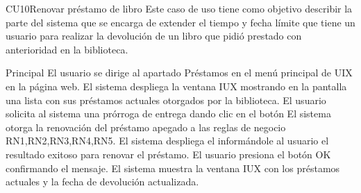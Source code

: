 
	\begin{UseCase}{CU10}{Renovar préstamo de libro}{
		Este caso de uso tiene como objetivo describir la parte del sistema que se encarga de extender el tiempo y fecha límite que tiene un usuario para realizar la devolución de un libro que pidió prestado con anterioridad en la biblioteca.
	}
	\end{UseCase}
	\begin{UCtrayectoria}{Principal}
		\UCpaso[\UCactor] El usuario se dirige al apartado Préstamos en el menú principal de UIX en la página web.  
		\UCpaso[\UCsist]El sistema despliega la ventana IUX mostrando en la pantalla una lista con sus préstamos actuales otorgados por la biblioteca.
				\UCpaso[\UCactor] El usuario solicita al sistema una prórroga de entrega  dando clic en el botón 
						\UCpaso[\UCsist]El sistema otorga la renovación del préstamo apegado a las reglas de negocio RN1,RN2,RN3,RN4,RN5.   \Trayref{C}   
		\UCpaso[\UCsist] El sistema despliega el  informándole al usuario el resultado exitoso para renovar el préstamo.
				\UCpaso[\UCactor]El usuario presiona el botón OK confirmando el mensaje.
				\UCpaso[\UCsist]El sistema muestra la ventana IUX con los préstamos actuales y la fecha de devolución actualizada.
	\end{UCtrayectoria}
